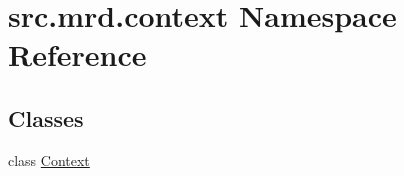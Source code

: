 \hypertarget{namespacesrc_1_1mrd_1_1context}{\section{src.\+mrd.\+context Namespace Reference}
\label{namespacesrc_1_1mrd_1_1context}
}
\subsection*{Classes}
\begin{DoxyCompactItemize}
\item 
class \hyperlink{classsrc_1_1mrd_1_1context_1_1_context}{Context}
\end{DoxyCompactItemize}
